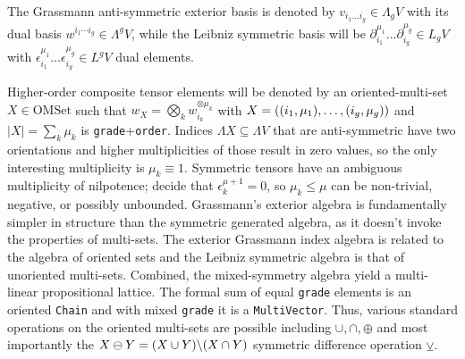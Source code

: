 \documentclass[]{article}
\begin{document}
\begin{definition}
	The Grassmann anti-symmetric exterior basis is denoted by $v_{i_1\dots i_g}\in\Lambda_gV$ with its dual basis $w^{i_1\cdots i_g}\in\Lambda^gV$, while the Leibniz symmetric basis will be $\partial_{i_1}^{\mu_1}\dots\partial_{i_g}^{\mu_g}\in L_gV$ with $\epsilon_{i_1}^{\mu_1}\dots\epsilon_{i_g}^{\mu_g}\in L^gV$ dual elements.
\end{definition}
Higher-order composite tensor elements will be denoted by an oriented-multi-set $X\in\text{OMSet}$ such that $w_X = \bigotimes_k w_{i_k}^{\otimes\mu_k}$ with $X = \left((i_1,\mu_1),\dots,(i_g,\mu_g)\right)$ and $|X|=\sum_k\mu_k$ is \verb`grade`+\verb`order`.
Indices $\Lambda X\subseteq\Lambda V$ that are anti-symmetric have two orientations and higher multiplicities of those result in zero values, so the only interesting multiplicity is $\mu_k\equiv 1$.
Symmetric tensors have an ambiguous multiplicity of nilpotence; decide that $\epsilon_k^{\mu+1}=0$, so $\mu_k\leq\mu$ can be non-trivial, negative, or possibly unbounded.
Grassmann's exterior algebra is fundamentally simpler in structure than the symmetric generated algebra, as it doesn't invoke the properties of multi-sets.
The exterior Grassmann index algebra is related to the algebra of oriented sets and the Leibniz symmetric algebra is that of unoriented multi-sets. 
Combined, the mixed-symmetry algebra yield a multi-linear propositional lattice.
The formal sum of equal \verb`grade` elements is an oriented \verb`Chain` and with mixed \verb`grade` it is a \verb`MultiVector`.
Thus, various standard operations on the oriented multi-sets are possible including $\cup,\cap,\oplus$ and most importantly the $X\ominus Y=(X\cup Y)\backslash(X\cap Y)$ symmetric difference operation $\veebar$.
\end{document}
